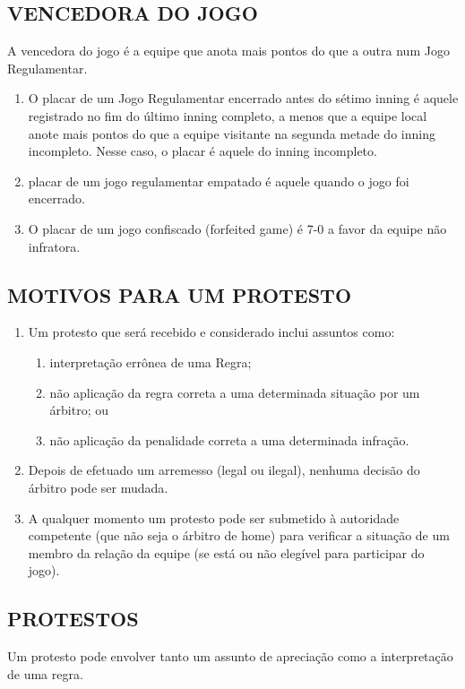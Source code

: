 \subsection{VENCEDORA DO JOGO}

A vencedora do jogo é a equipe que anota mais pontos do que a outra num Jogo Regulamentar.

\begin{enumerate}[label=(\alph*)]
	\item  O placar de um Jogo Regulamentar encerrado antes do sétimo \gls{inning} é aquele registrado no fim do último \gls{inning} completo, a menos que a equipe local anote mais pontos do que a equipe visitante na segunda metade do \gls{inning} incompleto. Nesse caso, o placar é aquele do \gls{inning} incompleto.
	\item  placar de um jogo regulamentar empatado é aquele quando o jogo foi encerrado.
	\item  O placar de um jogo confiscado (\gls{forfeited game}) é 7-0 a favor da equipe não infratora.
\end{enumerate}

\subsection{MOTIVOS PARA UM PROTESTO}

\begin{enumerate}[label=(\alph*)]
	\item  Um protesto que será recebido e considerado inclui assuntos como:
	\begin{enumerate}[label=\roman*.]
		\item  interpretação errônea de uma Regra;
		\item  não aplicação da regra correta a uma determinada situação por um árbitro; ou
		\item  não aplicação da penalidade correta a uma determinada infração.
	\end{enumerate}
	\item  Depois de efetuado um arremesso (legal ou ilegal), nenhuma decisão do árbitro pode ser mudada.
	\item  A qualquer momento um protesto pode ser submetido à autoridade  competente (que não seja o árbitro de \gls{home}) para verificar a situação de um membro da relação da equipe (se está ou não elegível para participar do jogo).
\end{enumerate}

\subsection{PROTESTOS}
Um protesto pode envolver tanto um assunto de apreciação como a interpretação de uma regra.

